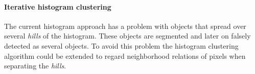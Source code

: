 \paragraph{Iterative histogram clustering} %
\label{par:iterative_histogram_clustering}
The current histogram approach has a problem with objects that spread over several \emph{hills} of the histogram. These objects are segmented and later on falsely detected as several objects. To avoid this problem the histogram clustering algorithm could be extended to regard neighborhood relations of pixels when separating the \emph{hills}.


















